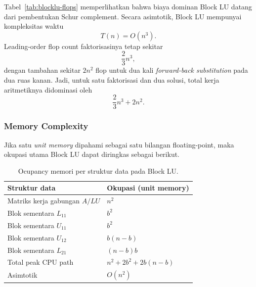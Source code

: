 \documentclass[12pt,a4paper]{article}
\begin{document}
\begin{table}[h]
\centering
\caption{Akumulasi FLOPS per fase pada Block LU.}
\label{tab:blocklu-flops}
\end{table}

Tabel~\ref{tab:blocklu-flops} memperlihatkan bahwa biaya dominan Block LU datang dari pembentukan Schur complement. Secara asimtotik, Block LU mempunyai kompleksitas waktu
\[
T(n)=O(n^3).
\]
Leading-order flop count faktorisasinya tetap sekitar
\[
\frac{2}{3}n^3,
\]
dengan tambahan sekitar $2n^2$ flop untuk dua kali \emph{forward-back substitution} pada dua ruas kanan. Jadi, untuk satu faktorisasi dan dua solusi, total kerja aritmetiknya didominasi oleh
\[
\frac{2}{3}n^3 + 2n^2.
\]

\subsubsection*{Memory Complexity}
Jika satu \emph{unit memory} dipahami sebagai satu bilangan floating-point, maka okupasi utama Block LU dapat diringkas sebagai berikut.

\begin{table}[h]
\centering
\caption{Ocupancy memori per struktur data pada Block LU.}
\label{tab:blocklu-memory}
\begin{tabular}{ll}
\toprule
Struktur data & Okupasi (unit memory) \\
\midrule
Matriks kerja gabungan $A/LU$ & $n^2$ \\
Blok sementara $L_{11}$ & $b^2$ \\
Blok sementara $U_{11}$ & $b^2$ \\
Blok sementara $U_{12}$ & $b(n-b)$ \\
Blok sementara $L_{21}$ & $(n-b)b$ \\
\midrule
Total peak CPU path & $n^2 + 2b^2 + 2b(n-b)$ \\
Asimtotik & $O(n^2)$ \\
\bottomrule
\end{tabular}
\end{table}
\end{document}
